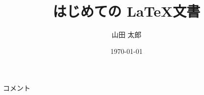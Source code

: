 \documentclass[titlepage]{ltjsarticle}
\title{はじめての \LaTeX 文書}
\author{山田 太郎}
\date{\today}
\begin{document}
コメント
\end{document}
